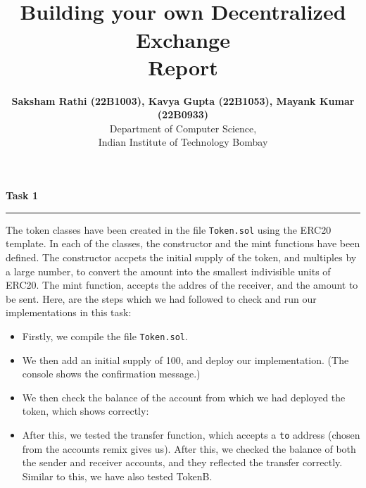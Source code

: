\documentclass[a4paper]{article}
\title{\cooltitle{CS765 Homework 3} \\
\LARGE \textbf{Building your own Decentralized Exchange} \\
{\bf Report}}
\author{{\bf Saksham Rathi (22B1003), Kavya Gupta (22B1053), Mayank Kumar (22B0933)} \\
\small Department of Computer Science, \\
Indian Institute of Technology Bombay \\}
\date{}
\newenvironment{solution}[2][]{%
\begin{mdframed}[linecolor=blue!70!black, linewidth=2pt, roundcorner=10pt, backgroundcolor=yellow!10!white, skipabove=12pt, skipbelow=12pt]%
	\textbf{\large #2}
	\par\noindent\rule{\textwidth}{0.4pt}
}{
\end{mdframed}
}
\begin{document}
\maketitle

\begin{solution}{Task 1}
	The token classes have been created in the file \texttt{Token.sol} using the ERC20 template. In each of the classes, the constructor and the mint functions have been defined. The constructor accpets the initial supply of the token, and multiples by a large number, to convert the amount into the smallest indivisible units of ERC20. The mint function, accepts the addres of the receiver, and the amount to be sent. Here, are the steps which we had followed to check and run our implementations in this task:

	\begin{itemize}
		\item Firstly, we compile the file \texttt{Token.sol}.
		\item We then add an initial supply of 100, and deploy our implementation. (The console shows the confirmation message.)

		\begin{figure}[H]
			\centering
		\end{figure}

		\item We then check the balance of the account from which we had deployed the token, which shows correctly:
		
		\begin{figure}[H]
			\centering
		\end{figure}

		\item After this, we tested the transfer function, which accepts a \texttt{to} address (chosen from the accounts remix gives us). After this, we checked the balance of both the sender and receiver accounts, and they reflected the transfer correctly. Similar to this, we have also tested TokenB.
		\begin{figure}[H]
			\centering
		\end{figure}
	\end{itemize}
\end{solution}

\clearpage
\end{document}
